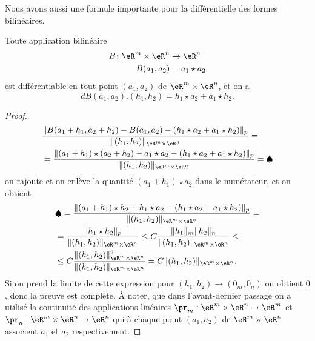 Nous avons aussi une formule importante pour la différentielle des formes bilinéaires.
  \begin{lemma}\label{bilin_diff}
    Toute application bilinéaire 
    \begin{equation}
	    \begin{aligned}
		    B\colon \eR^m\times\eR^n&\to \eR^p \\
		    B(a_1,a_2)&=a_1 \star a_2
	    \end{aligned}
    \end{equation}
    est différentiable en tout point $(a_1,a_2)$ de $\eR^m\times\eR^n$, et on a
\[
dB(a_1,a_2).(h_1,h_2)=h_1\star a_2 + a_1\star h_2.
\] 
  \end{lemma}
  \begin{proof}
    \begin{equation}
      \begin{aligned}
  & \frac{\|B(a_1+h_1,a_2+h_2)-B(a_1,a_2)-(h_1\star a_2 + a_1\star h_2)\|_p}{\|(h_1,h_2)\|_{\eR^m\times\eR^n}} = \\ 
&= \frac{\|(a_1+h_1)\star(a_2+h_2)-a_1\star a_2-(h_1\star a_2 + a_1\star h_2)\|_p}{\|(h_1,h_2)\|_{\eR^m\times\eR^n}}=\spadesuit
 \end{aligned}
    \end{equation}
on rajoute et on enlève la quantité $(a_1+h_1)\star a_2$ dans le numérateur, et on obtient  
   \begin{equation}
      \begin{aligned}
&\spadesuit= \frac{\|(a_1+h_1)\star h_2+h_1\star a_2-(h_1\star a_2 + a_1\star h_2)\|_p}{\|(h_1,h_2)\|_{\eR^m\times\eR^n}}=\\
&= \frac{\|h_1\star h_2\|_p}{\|(h_1,h_2)\|_{\eR^m\times\eR^n}}\leq C\frac{\|h_1\|_m\|h_2\|_n}{\|(h_1,h_2)\|_{\eR^m\times\eR^n}}\leq\\
&\leq C\frac{\|(h_1,h_2)\|^2_{\eR^m\times\eR^n}}{\|(h_1,h_2)\|_{\eR^m\times\eR^n}}= C\|(h_1,h_2)\|_{\eR^m\times\eR^n}.
      \end{aligned}
    \end{equation}
Si on prend la limite de cette expression pour $(h_1,h_2)\to (0_m,0_n)$ on obtient $0$, donc la preuve est complète. À noter, que dans l'avant-dernier passage on a utilisé la continuité des applications linéaires $\pr_m:\eR^m\times\eR^n\to \eR^m$ et $\pr_n: \eR^m\times\eR^n\to \eR^n$ qui à chaque point $(a_1,a_2)$ de $\eR^m\times\eR^n$ associent $a_1$ et $a_2$ respectivement.  
\end{proof}

